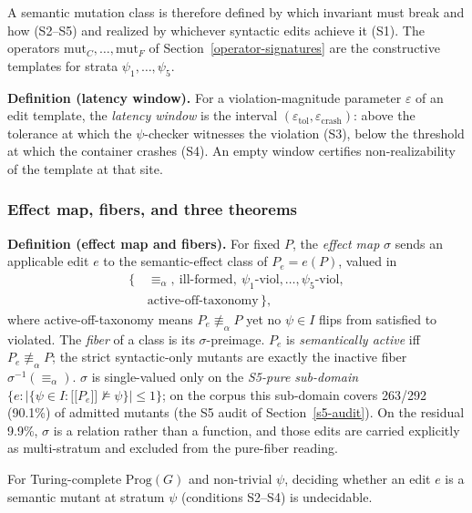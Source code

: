 \documentclass[manuscript,screen,review]{acmart}
\begin{document}
A semantic mutation class is therefore defined by which invariant must
break and how (S2--S5) and realized by whichever syntactic edits achieve
it (S1). The operators $\mathrm{mut}_C, \dots, \mathrm{mut}_F$ of Section~\ref{operator-signatures}
are the constructive templates for strata $\psi_1, \dots, \psi_5$.

\textbf{Definition (latency window).} For a violation-magnitude
parameter $\varepsilon$ of an edit template, the \emph{latency window}
is the interval $(\varepsilon_{\mathrm{tol}}, \varepsilon_{\mathrm{crash}})$:
above the tolerance at which the $\psi$-checker witnesses the violation
(S3), below the threshold at which the container crashes (S4). An empty
window certifies non-realizability of the template at that site.

\subsubsection{Effect map, fibers, and three theorems}\label{theory-fibers}

\textbf{Definition (effect map and fibers).} For fixed $P$, the
\emph{effect map} $\sigma$ sends an applicable edit $e$ to the
semantic-effect class of $P_e = e(P)$, valued in
\[
\begin{aligned}
\{\,&\equiv_\alpha,\ \text{ill-formed},\
      \psi_1\text{-viol}, \dots, \psi_5\text{-viol},\\
   &\text{active-off-taxonomy}\,\},
\end{aligned}
\]
where active-off-taxonomy means $P_e \not\equiv_\alpha P$ yet no
$\psi \in I$ flips from satisfied to violated. The \emph{fiber} of a
class is its $\sigma$-preimage. $P_e$ is \emph{semantically active} iff
$P_e \not\equiv_\alpha P$; the strict syntactic-only mutants are exactly
the inactive fiber $\sigma^{-1}(\equiv_\alpha)$. $\sigma$ is single-valued
only on the \emph{S5-pure sub-domain}
$\{e : |\{\psi \in I : \mathopen{\lbrack\!\lbrack} P_e \mathclose{\rbrack\!\rbrack} \not\models \psi\}| \le 1\}$;
on the corpus this sub-domain covers 263/292 (90.1\%) of admitted mutants
(the S5 audit of Section~\ref{s5-audit}). On the residual 9.9\%, $\sigma$
is a relation rather than a function, and those edits are carried
explicitly as multi-stratum and excluded from the pure-fiber reading.

\begin{theorem}\label{thm:undecidability}
For
Turing-complete $\mathrm{Prog}(G)$ and non-trivial $\psi$, deciding
whether an edit $e$ is a semantic mutant at stratum $\psi$
(conditions S2--S4) is undecidable.
\end{theorem}
\end{document}
